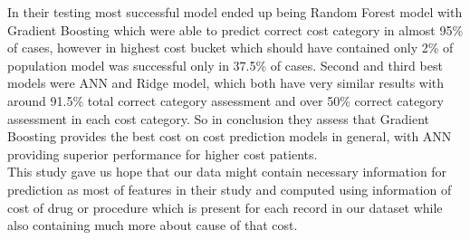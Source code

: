 In their testing most successful model ended up being Random Forest model with Gradient Boosting which were able to predict correct cost category in almost 95\% of cases, however in highest cost bucket which should have contained only 2\% of population model was successful only in 37.5\% of cases. Second and third best models were ANN and Ridge model, which both have very similar results with around 91.5\% total correct category assessment and over 50\% correct category assessment in each cost category. So in conclusion they assess that Gradient Boosting provides the best cost on cost prediction models in general, with ANN providing superior performance for higher cost patients.
\\

This study gave us hope that our data might contain necessary information for prediction as most of features in their study and computed using information of cost of drug or procedure which is present for each record in our dataset while also containing much more about cause of that cost.